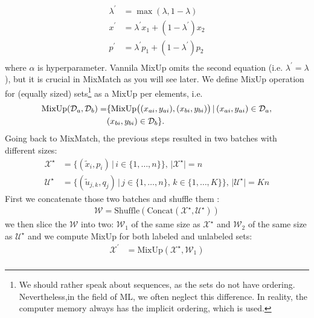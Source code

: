 \begin{enumerate}
\begin{align*}
                \lambda^\prime &= \max(\lambda,1-\lambda) \\
                x^\prime &= \lambda^\prime x_1 + (1-\lambda^\prime) x_2 \\
                p^\prime &= \lambda^\prime p_1 + (1-\lambda^\prime) p_2 \\
            \end{align*}
            where $\alpha$ is hyperparameter. Vannila MixUp omits the second equation (i.e. $\lambda^\prime = \lambda$), but it is crucial in MixMatch as you will
            see later. We define MixUp operation for (equally sized) sets\footnote{We should rather speak about sequences, as the sets do not have ordering. 
            Nevertheless,in the field of ML, we often neglect this difference. In reality, the computer memory always has the implicit ordering, which is used.} 
            as a MixUp per elements, i.e.
            \begin{equation*}
                \begin{split}
                    \text{MixUp}(\mathcal{D}_a,\mathcal{D}_b) = & \{\text{MixUp} \big{(} (x_{ai},y_{ai}),(x_{bi},y_{bi}) \big{)}\,|\, (x_{ai},y_{ai}) \in \mathcal{D}_a, \\
                    &(x_{bi},y_{bi}) \in \mathcal{D}_b  \}.
                \end{split}
            \end{equation*}
        Going back to MixMatch, the previous steps resulted in two batches with different sizes:
            \begin{align*}
                \mathcal{X}^\star &= \{ (\tilde{x}_i,p_i)\,|\, i \in \{1,\dots,n\}  \}, \, |\mathcal{X}^\star| = n \\
                \mathcal{U}^\star &= \{ (\tilde{u}_{j,k},q_j)\,|\, j \in \{1,\dots,n\},\,k \in \{1,\dots,K\}  \}, \, |\mathcal{U}^\star| = Kn 
            \end{align*}
        First we concatenate those two batches and shuffle them :
            \begin{align*}
                \mathcal{W} = \text{Shuffle}(\text{Concat}(\mathcal{X}^\star,\mathcal{U}^\star))
            \end{align*}
        we then slice the $\mathcal{W}$ into two: $\mathcal{W}_1$ of the same size as $\mathcal{X}^\star$ and $\mathcal{W}_2$ of the same size 
        as $\mathcal{U}^\star$ and we compute MixUp for both labeled and unlabeled sets:
        \begin{align*}
            \mathcal{X}^\prime &= \text{MixUp}(\mathcal{X}^\star,\mathcal{W}_1) \\

\end{align*}
\end{enumerate}
